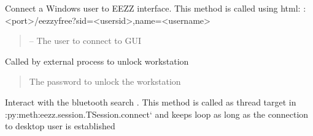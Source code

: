 \documentclass[letterpaper,10pt,english]{sphinxmanual}
\begin{document}
\begin{savenotes}
\begin{fulllineitems}
\begin{savenotes}\begin{fulllineitems}
\label{\detokenize{eezz:eezz.session.TSession.connect}}
\pysigstartsignatures
{}
\pysigstopsignatures
\sphinxAtStartPar
Connect a Windows user to EEZZ interface. This method is called using html:
:<port>/eezzyfree?sid=<user\sphinxhyphen{}sid>,name=<user\sphinxhyphen{}name>
\begin{quote}\begin{description}
\sphinxAtStartPar
{} – The user to connect to GUI

\end{description}\end{quote}

\end{fulllineitems}\end{savenotes}


\begin{savenotes}\begin{fulllineitems}
\label{\detokenize{eezz:eezz.session.TSession.get_user_pwd}}
\pysigstartsignatures
{}
\pysigstopsignatures
\sphinxAtStartPar
Called by external process to unlock workstation
\begin{quote}\begin{description}
\sphinxAtStartPar
The password to unlock the workstation

\end{description}\end{quote}

\end{fulllineitems}\end{savenotes}


\begin{savenotes}\begin{fulllineitems}
\label{\detokenize{eezz:eezz.session.TSession.handle_bt_devices}}
\pysigstartsignatures
{}
\pysigstopsignatures
\sphinxAtStartPar
Interact with the bluetooth search {\hyperref[\detokenize{eezz:eezz.blueserv.TBluetooth.find_devices}]{}}. This
method is called as thread target in :py:meth:eezz.session.TSession.connect` and keeps loop
as long as the connection to desktop user is established


\end{fulllineitems}
\end{savenotes}
\end{fulllineitems}
\end{savenotes}
\end{document}
